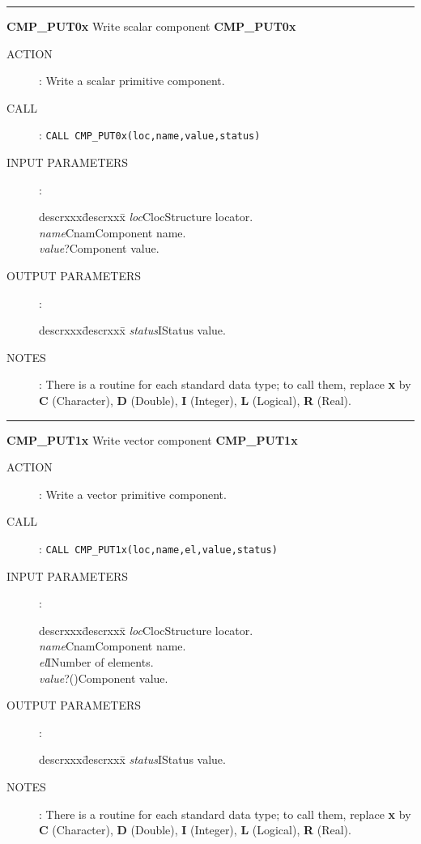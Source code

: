 \goodbreak
\rule{\textwidth}{0.3mm}
{\Large {\bf CMP\_PUT0x} \hfill Write scalar component \hfill {\bf CMP\_PUT0x}}
\begin{description}
\item [ACTION]:
Write a scalar primitive component.
\item [CALL]:
{\tt CALL CMP\_PUT0x(loc,name,value,status)}
\item [INPUT PARAMETERS]:
\begin{tabbing}
descrxxx\=descrxxx\=\kill
{\em loc}\>Cloc\>Structure locator.\\
{\em name}\>Cnam\>Component name.\\
{\em value}\>?\>Component value.
\end{tabbing}
\item [OUTPUT PARAMETERS]:
\begin{tabbing}
descrxxx\=descrxxx\=\kill
{\em status}\>I\>Status value.
\end{tabbing}
\item [NOTES]:
There is a routine for each standard data type; to call them, replace {\bf x}
by {\bf C} (Character), {\bf D} (Double), {\bf I} (Integer), {\bf L} (Logical),
{\bf R} (Real).
\end{description}
\goodbreak
\rule{\textwidth}{0.3mm}
{\Large {\bf CMP\_PUT1x} \hfill Write vector component \hfill {\bf CMP\_PUT1x}}
\begin{description}
\item [ACTION]:
Write a vector primitive component.
\item [CALL]:
{\tt CALL CMP\_PUT1x(loc,name,el,value,status)}
\item [INPUT PARAMETERS]:
\begin{tabbing}
descrxxx\=descrxxx\=\kill
{\em loc}\>Cloc\>Structure locator.\\
{\em name}\>Cnam\>Component name.\\
{\em el}\>I\>Number of elements.\\
{\em value}\>?()\>Component value.
\end{tabbing}
\item [OUTPUT PARAMETERS]:
\begin{tabbing}
descrxxx\=descrxxx\=\kill
{\em status}\>I\>Status value.
\end{tabbing}
\item [NOTES]:
There is a routine for each standard data type; to call them, replace {\bf x}
by {\bf C} (Character), {\bf D} (Double), {\bf I} (Integer), {\bf L} (Logical),
{\bf R} (Real).
\end{description}
